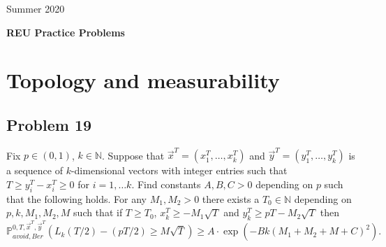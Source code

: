 \documentclass[12pt]{article}
\begin{document}
	\begin{flushright}
		Summer 2020
	\end{flushright}
	
	\begin{center}
		\LARGE\textbf{REU Practice Problems}
	\end{center}


\section{Topology and measurability}

\subsection*{Problem 19}
Fix $p \in (0,1)$, $k \in \mathbb{N}$. Suppose that $\vec{x}^T = (x^T_1, \dots, x^T_k)$ and $\vec{y}^T = (y^T_1, \dots, y^T_k)$ is a sequence of $k$-dimensional vectors with integer entries such that $T\geq y_i^T -x_i^T \geq 0$ for $i = 1, \dots k$. Find constants $A,B,C >0$ depending on $p$ such that the following holds. For any $M_1, M_2 > 0$ there exists a $T_0 \in \mathbb{N}$ depending on $p,k,M_1,M_2, M$ such that if $T \geq T_0$, $x_k^T \geq - M_1 \sqrt{T}$ and $y_k^T \geq pT - M_2 \sqrt{T}$ then 
$$\mathbb{P}_{avoid, Ber}^{0,T, \vec{x}^T, \vec{y}^T} \left( L_k(T/2) - (pT/2) \geq M \sqrt{T} \right) \geq A \cdot \exp \left( - Bk (M_1 + M_2 + M + C)^2 \right).$$
\end{document}
